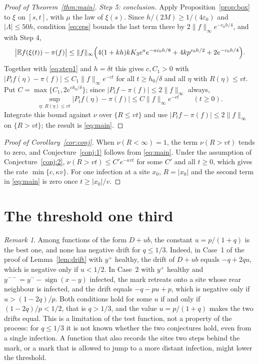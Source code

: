 \documentclass[11pt]{amsart}
\theoremstyle{definition}
\theoremstyle{remark}
\newtheorem{remark}[theorem]{Remark}
\newcommand{\E}{\mathbb{E}}
\begin{document}
\begin{proof}[Proof of Theorem~\ref{thm:main}]
\emph{Step 5: conclusion.} Apply Proposition~\ref{prop:box} to $\xi$ on $[s,t]$, with $\mu$ the law of $\xi(s)$. Since
$h/(2M)\ge1/(4\varepsilon_0)$ and $|\Lambda|\le50h$, condition \eqref{eq:eps} bounds the last term there by
$2\|f\|_\infty e^{-c_0h/4}$, and with Step 4,
\[
\bigl|\E f(\xi(t))-\pi(f)\bigr|\le\|f\|_\infty\Bigl(4(1+kh)kK_3e^ae^{-a\varepsilon_0h/8}+4kp^{\varepsilon_0h/2}
+2e^{-c_0h/4}\Bigr).
\]
Together with \eqref{eq:step1} and $h=\delta t$ this gives $c,C_1>0$ with $|P_tf(\eta)-\pi(f)|\le C_1\|f\|_\infty e^{-ct}$
for all $t\ge h_0/\delta$ and all $\eta$ with $R(\eta)\le vt$. Put $C=\max\{C_1,2e^{ch_0/\delta}\}$; since
$|P_tf-\pi(f)|\le2\|f\|_\infty$ always,
\begin{equation}\label{eq:pointwise}
\sup_{\eta:\ R(\eta)\le vt}\bigl|P_tf(\eta)-\pi(f)\bigr|\le C\|f\|_\infty e^{-ct}\qquad(t\ge0).
\end{equation}
Integrate this bound against $\nu$ over $\{R\le vt\}$ and use $|P_tf-\pi(f)|\le2\|f\|_\infty$ on $\{R>vt\}$; the
result is \eqref{eq:main}.
\end{proof}

\begin{proof}[Proof of Corollary~\ref{cor:conj}]
When $\nu(R<\infty)=1$, the term $\nu(R>vt)$ tends to zero, and Conjecture~\ref{conj:1} follows from \eqref{eq:main}. Under
the assumption of Conjecture~\ref{conj:2}, $\nu(R>vt)\le C'e^{-\kappa vt}$ for some $C'$ and all $t\ge0$, which gives the rate
$\min\{c,\kappa v\}$. For one infection at a site $x_0$, $R=|x_0|$ and the second term in \eqref{eq:main} is zero once
$t\ge|x_0|/v$.
\end{proof}

\section{The threshold one third}\label{sec:remarks}

\begin{remark}\label{rem:third}
Among functions of the form $D+ub$, the constant $u=p/(1+q)$ is the best one, and none has negative drift for $q\le1/3$.
Indeed, in Case~1 of the proof of Lemma~\ref{lem:drift} with $y^+$ healthy, the drift of $D+ub$ equals $-q+2qu$, which is
negative only if $u<1/2$. In Case~2 with $y^+$ healthy and $y^{--}=y^--\operatorname{sign}(x-y)$ infected, the mark
retreats onto a site whose rear neighbour is infected, and the drift equals $-q-pu+p$, which is negative only if
$u>(1-2q)/p$. Both conditions hold for some $u$ if and only if $(1-2q)/p<1/2$, that is $q>1/3$, and the value
$u=p/(1+q)$ makes the two drifts equal. This is a limitation of the test function, not a property of the process: for
$q\le1/3$ it is not known whether the two conjectures hold, even from a single infection. A function that also records the
sites two steps behind the mark, or a mark that is allowed to jump to a more distant infection, might lower the threshold.
\end{remark}
\end{document}
